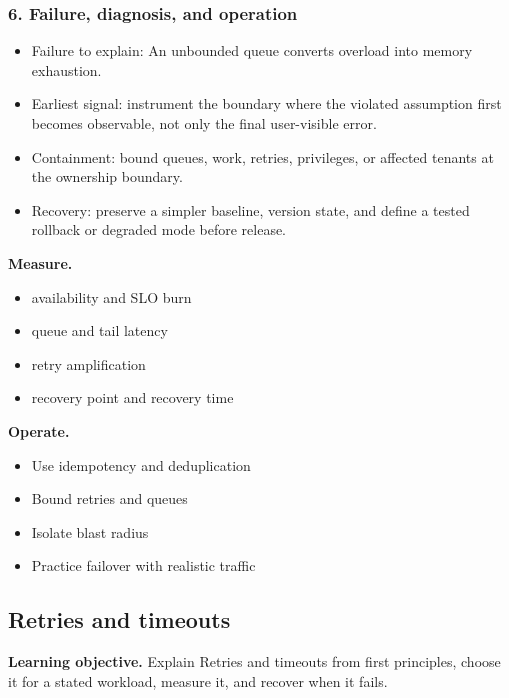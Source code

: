 \subsubsection*{6. Failure, diagnosis, and operation}
\begin{itemize}
\item Failure to explain: An unbounded queue converts overload into memory exhaustion.
\item Earliest signal: instrument the boundary where the violated assumption first becomes observable, not only the final user-visible error.
\item Containment: bound queues, work, retries, privileges, or affected tenants at the ownership boundary.
\item Recovery: preserve a simpler baseline, version state, and define a tested rollback or degraded mode before release.
\end{itemize}
\textbf{Measure.}\begin{itemize}
\item availability and SLO burn
\item queue and tail latency
\item retry amplification
\item recovery point and recovery time
\end{itemize}
\textbf{Operate.}\begin{itemize}
\item Use idempotency and deduplication
\item Bound retries and queues
\item Isolate blast radius
\item Practice failover with realistic traffic
\end{itemize}
\subsection{Retries and timeouts}
\textbf{Learning objective.} Explain Retries and timeouts from first principles, choose it for a stated workload, measure it, and recover when it fails.
